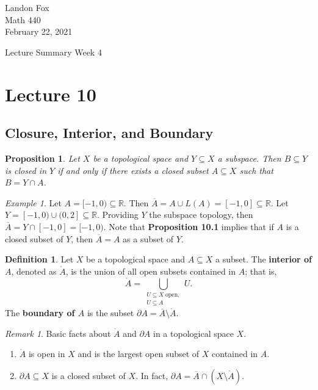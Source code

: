 \documentclass[ 12pt ]{article}
\newcounter{lecture_num}
\theoremstyle{plain}
\theoremstyle{plain}
\newtheorem{proposition}[theorem]{Proposition}
\theoremstyle{definition}
\newtheorem{definition}[theorem]{Definition}
\theoremstyle{remark}
\newtheorem{remark}[theorem]{Remark}
\newtheorem{example}[theorem]{Example}
\begin{document}
\noindent Landon Fox \\
\noindent Math 440 \\
\noindent February 22, 2021

\begin{center}
	\Large Lecture Summary Week 4
\end{center}

\setcounter{lecture_num}{10}
\setcounter{theorem}{0}
\section*{Lecture 10}

\subsection*{Closure, Interior, and Boundary}

\begin{proposition}
	Let $X$ be a topological space and $Y \subseteq X$ a subspace. Then $B \subseteq Y$ is closed in $Y$ if and only if there exists a closed subset $A \subseteq X$ such that $B = Y \cap
	A$.
\end{proposition}

\begin{example}
	Let $A = [-1, 0) \subseteq \mathbb{R}$. Then $\overline{A} = A \cup L(A) = [-1, 0] \subseteq \mathbb{R}$. Let $Y = [-1, 0) \cup (0, 2] \subseteq \mathbb{R}$. Providing $Y$ the
	subspace topology, then $\overline{A} = Y \cap [-1, 0] = [-1, 0)$. Note that \textbf{Proposition 10.1} implies that if $A$ is a closed subset of $Y$, then $\overline{A} = A$ as a
	subset of $Y$.
\end{example}

\begin{definition}
	Let $X$ be a topological space and $A \subseteq X$ a subset. The \textbf{interior of $A$}, denoted as $\mathring{A}$, is the union of all open subsets contained in $A$; that is,
	$$\mathring{A} = \bigcup_{\substack{U \subseteq X\; \mathrm{open}, \\ U \subseteq A}} U.$$ The \textbf{boundary of $A$} is the subset $\partial A = \overline{A} \setminus
	\mathring{A}$.
\end{definition}

\begin{remark}
	Basic facts about $\mathring{A}$ and $\partial A$ in a topological space $X$.
	\begin{enumerate}
		\item $\mathring{A}$ is open in $X$ and is the largest open subset of $X$ contained in $A$.
		\item $\partial A \subseteq X$ is a closed subset of $X$. In fact, $\partial A = \overline{A} \cap (X \setminus \mathring{A})$.
	\end{enumerate}
\end{remark}
\end{document}
